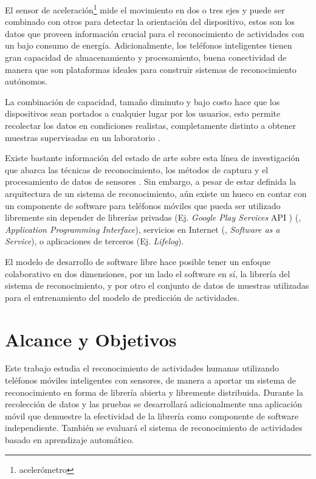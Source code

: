 El sensor de aceleración\footnote{acelerómetro} mide el movimiento
en dos o tres ejes y puede ser combinado con otros para detectar la
orientación del dispositivo, estos son los datos que proveen información
crucial para el reconocimiento de actividades con un bajo consumo
de energía. Adicionalmente, los teléfonos inteligentes tienen gran
capacidad de almacenamiento y procesamiento, buena conectividad de
manera que son plataformas ideales para construir sistemas de reconocimiento
autónomos.

La combinación de capacidad, tamaño diminuto y bajo costo hace que
los dispositivos sean portados a cualquier lugar por los usuarios,
esto permite recolectar los datos en condiciones realistas, completamente
distinto a obtener muestras supervisadas en un laboratorio \cite{Bao2004}. 

Existe bastante información del estado de arte sobre esta línea de
investigación que abarca las técnicas de reconocimiento, los métodos
de captura y el procesamiento de datos de sensores \cite{LaraLabrador2012,Kwapisz2011}.
Sin embargo, a pesar de estar definida la arquitectura de un sistema
de reconocimiento, aún existe un hueco en contar con un componente
de software para teléfonos móviles que pueda ser utilizado libremente
sin depender de librerías privadas (Ej. \emph{Google Play Services}
API \cite{Google2016l}) (, \emph{Application Programming
Interface}), servicios en Internet (, \emph{Software as
a Service}), o aplicaciones de terceros (Ej. \emph{Lifelog}).

El modelo de desarrollo de software libre hace posible tener un enfoque
colaborativo en dos dimensiones, por un lado el software en sí, la
librería del sistema de reconocimiento, y por otro el conjunto de
datos de muestras utilizadas para el entrenamiento del modelo de predicción
de actividades.

\section{Alcance y Objetivos}

\label{sec13:alcance-y-objetivos}

Este trabajo estudia el reconocimiento de actividades humanas utilizando
teléfonos móviles inteligentes con sensores, de manera a aportar un
sistema de reconocimiento en forma de librería abierta y libremente
distribuida. Durante la recolección de datos y las pruebas se desarrollará
adicionalmente una aplicación móvil que demuestre la efectividad de
la librería como componente de software independiente. También se
evaluará el sistema de reconocimiento de actividades basado en aprendizaje
automático.

